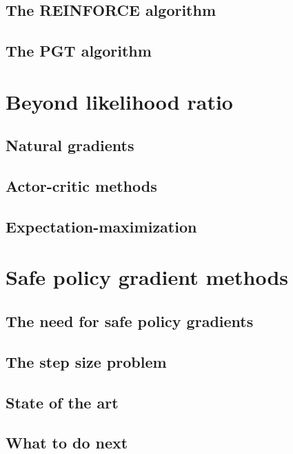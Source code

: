 \subsection{The REINFORCE algorithm}

\subsection{The PGT algorithm}


\section{Beyond likelihood ratio}
\subsection{Natural gradients}
\subsection{Actor-critic methods}
\subsection{Expectation-maximization}

\section{Safe policy gradient methods}
\subsection{The need for safe policy gradients}
\subsection{The step size problem}
\subsection{State of the art}
\subsection{What to do next}